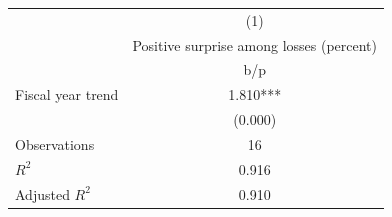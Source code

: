 {
\def\sym#1{\ifmmode^{#1}\else\(^{#1}\)\fi}
\begin{tabular}{l*{1}{c}}
\hline\hline
                    &\multicolumn{1}{c}{(1)}\\
                    &\multicolumn{1}{c}{Positive surprise among losses (percent)}\\
                    &         b/p   \\
\hline
Fiscal year trend   &       1.810***\\
                    &     (0.000)   \\
\hline
Observations        &          16   \\
\(R^{2}\)           &       0.916   \\
Adjusted \(R^{2}\)  &       0.910   \\
\hline\hline
\end{tabular}
}
